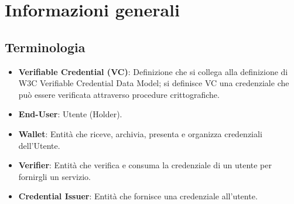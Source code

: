 \section{Informazioni generali}

\subsection{Terminologia}
\begin{itemize}
    \item \textbf{Verifiable Credential (VC)}: Definizione che si collega alla definizione di W3C Verifiable Credential Data Model; si definisce VC una credenziale che può essere verificata attraverso procedure crittografiche.
    \item \textbf{End-User}: Utente (Holder).
    \item \textbf{Wallet}: Entità che riceve, archivia, presenta e organizza credenziali dell'Utente.
    \item \textbf{Verifier}: Entità che verifica e consuma la credenziale di un utente per fornirgli un servizio.
    \item \textbf{Credential Issuer}: Entità che fornisce una credenziale all'utente.
\end{itemize}





